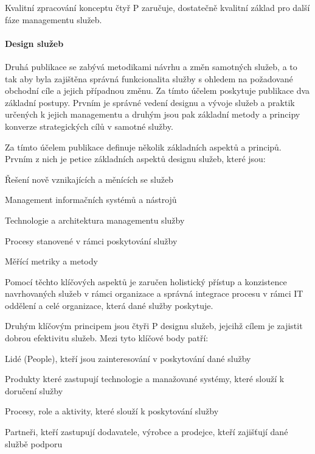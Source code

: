 \documentclass[
  digital,     %
  twoside,     %
  lof,         %
  lot,         %
]{fithesis4}
\begin{document}
Kvalitní zpracování konceptu čtyř P zaručuje, dostatečně kvalitní základ pro další fáze managementu služeb.


\paragraph{Design služeb}
Druhá publikace se zabývá metodikami návrhu a změn samotných služeb, a to tak aby byla zajištěna správná funkcionalita služby s ohledem na požadované obchodní cíle a jejich případnou změnu. Za tímto účelem poskytuje publikace dva základní postupy. Prvním je správné vedení designu a vývoje služeb a praktik určených k jejich managementu a druhým jsou pak základní metody a principy konverze strategických cílů v samotné služby.\parencite[s.~21]{Carlidge2007}

Za tímto účelem publikace definuje několik základních aspektů a principů. Prvním z nich je petice základních aspektů designu služeb, které jsou: \parencite[s.~22]{Carlidge2007}
\begin{compactitem}
    \item Řešení nově vznikajících a měnících se služeb
    \item Management informačních systémů a nástrojů
    \item Technologie a architektura managementu služby
    \item Procesy stanovené v rámci poskytování služby
    \item Měřící metriky a metody
\end{compactitem}
Pomocí těchto klíčových aspektů je zaručen holistický přístup a konzistence navrhovaných služeb v rámci organizace a správná integrace procesu v rámci IT oddělení a celé organizace, která dané služby poskytuje. \parencite[s.~22]{Carlidge2007}

Druhým klíčovým principem jsou čtyři P designu služeb, jejcihž cílem je zajistit dobrou efektivitu služeb. Mezi tyto klíčové body patří:\parencite[s.~22]{Carlidge2007}
\begin{compactitem}
    \item Lidé (People), kteří jsou zainteresování v poskytování dané služby
    \item Produkty které zastupují technologie a manažované systémy, které slouží k doručení služby
    \item Procesy, role a aktivity, které slouží k poskytování služby
    \item Partneři, kteří zastupují dodavatele, výrobce a prodejce, kteří zajišťují dané službě podporu
\end{compactitem}
\end{document}
